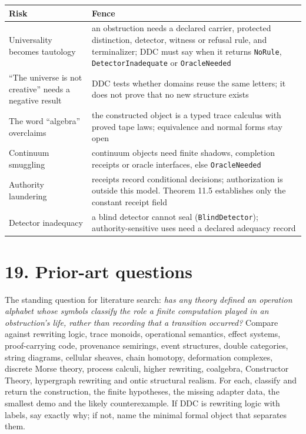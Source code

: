 \documentclass[
  11pt,
]{article}
\renewcommand{\_}{\ddcunderscore\allowbreak}
\begin{document}
\begin{longtable}[]{@{}
  >{\raggedright\arraybackslash}p{}
  >{\raggedright\arraybackslash}p{}@{}}
\toprule\noalign{}
\begin{minipage}[b]{\linewidth}\raggedright
Risk
\end{minipage} & \begin{minipage}[b]{\linewidth}\raggedright
Fence
\end{minipage} \\
\midrule\noalign{}
\endhead
\bottomrule\noalign{}
\endlastfoot
Universality becomes tautology & an obstruction needs a declared
carrier, protected distinction, detector, witness or refusal rule, and
terminalizer; DDC must say when it returns \texttt{No\allowbreak Rule},
\texttt{Detector\allowbreak Inadequate} or \texttt{Oracle\allowbreak Needed} \\
``The universe is not creative'' needs a negative result & DDC tests
whether domains reuse the same letters; it does not prove that no new
structure exists \\
The word ``algebra'' overclaims & the constructed object is a typed
trace calculus with proved tape laws; equivalence and normal forms stay
open \\
Continuum smuggling & continuum objects need finite shadows, completion
receipts or oracle interfaces, else \texttt{Oracle\allowbreak Needed} \\
Authority laundering & receipts record conditional decisions;
authorization is outside this model. Theorem 11.5 establishes only the
constant receipt field \\
Detector inadequacy & a blind detector cannot seal
(\texttt{Blind\allowbreak Detector}); authority-sensitive uses need a declared
adequacy record \\
\end{longtable}

\section{19. Prior-art questions}\label{prior-art-questions}

The standing question for literature search: \emph{has any theory
defined an operation alphabet whose symbols classify the role a finite
computation played in an obstruction's life, rather than recording that
a transition occurred?} Compare against rewriting logic, trace monoids,
operational semantics, effect systems, proof-carrying code, provenance
semirings, event structures, double categories, string diagrams,
cellular sheaves, chain homotopy, deformation complexes, discrete Morse
theory, process calculi, higher rewriting, coalgebra, Constructor
Theory, hypergraph rewriting and ontic structural realism. For each,
classify and return the construction, the finite hypotheses, the missing
adapter data, the smallest demo and the likely counterexample. If DDC is
rewriting logic with labels, say exactly why; if not, name the minimal
formal object that separates them.
\end{document}
